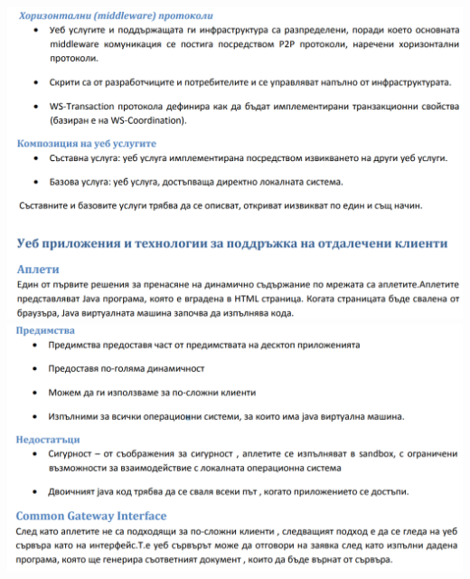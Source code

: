 \documentclass[11pt]{article} %
\begin{document}
\begin{center}
	\includegraphics[scale=0.65]{WebServices4.png}
	\includegraphics[scale=0.65]{WebServices5.png}
\end{center}
  
\end{document}
